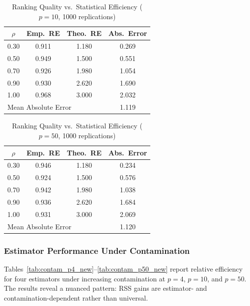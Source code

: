 \documentclass[12pt]{article}
\begin{document}
\begin{table}[htbp]
\centering
\caption{Ranking Quality vs.\ Statistical Efficiency ($p = 10$, 1000 replications)}
\label{tab:mv_rank_eff_p10}
\begin{tabular}{cccc}
\toprule
$\rho$ & Emp.\ RE & Theo.\ RE & Abs.\ Error \\
\midrule
0.30 & 0.911 & 1.180 & 0.269 \\
0.50 & 0.949 & 1.500 & 0.551 \\
0.70 & 0.926 & 1.980 & 1.054 \\
0.90 & 0.930 & 2.620 & 1.690 \\
1.00 & 0.968 & 3.000 & 2.032 \\
\midrule
\multicolumn{3}{l}{Mean Absolute Error} & 1.119 \\
\bottomrule
\end{tabular}
\end{table}

\begin{table}[htbp]
\centering
\caption{Ranking Quality vs.\ Statistical Efficiency ($p = 50$, 1000 replications)}
\label{tab:mv_rank_eff_p50}
\begin{tabular}{cccc}
\toprule
$\rho$ & Emp.\ RE & Theo.\ RE & Abs.\ Error \\
\midrule
0.30 & 0.946 & 1.180 & 0.234 \\
0.50 & 0.924 & 1.500 & 0.576 \\
0.70 & 0.942 & 1.980 & 1.038 \\
0.90 & 0.936 & 2.620 & 1.684 \\
1.00 & 0.931 & 3.000 & 2.069 \\
\midrule
\multicolumn{3}{l}{Mean Absolute Error} & 1.120 \\
\bottomrule
\end{tabular}
\end{table}

\subsubsection{Estimator Performance Under Contamination}

Tables~\ref{tab:contam_p4_new}--\ref{tab:contam_p50_new} report relative efficiency for four estimators under increasing contamination at $p = 4$, $p = 10$, and $p = 50$. The results reveal a nuanced pattern: RSS gains are estimator- and contamination-dependent rather than universal.
\end{document}
